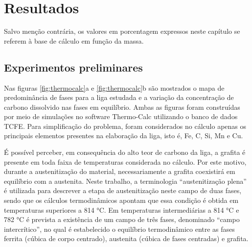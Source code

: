 \chapter{Resultados}

Salvo menção contrária, os valores em porcentagem expressos neste capítulo se referem à base de cálculo em função da massa.

\section{Experimentos preliminares}

\label{sec:expprelim}

Nas figuras \ref{fig:thermocalc}a e \ref{fig:thermocalc}b são mostrados o mapa de predominância de fases para a liga estudada e a variação da concentração de carbono dissolvido nas fases em equilíbrio. Ambas as figuras foram construídas por meio de simulações no software Thermo-Calc\textregistered{} utilizando o banco de dados TCFE. Para simplificação do problema, foram considerados no cálculo apenas os principais elementos presentes na elaboração da liga, isto é, Fe, C, Si, Mn e Cu.

É possível perceber, em consequência do alto teor de carbono da liga, a grafita é presente em toda faixa de temperaturas considerada no cálculo. Por este motivo, durante a austenitização do material, necessariamente a grafita coexistirá em equilíbrio com a austenita. Neste trabalho, a terminologia ``austenitização plena'' é utilizada para descrever a etapa de austenitização neste campo de duas fases, sendo que os cálculos termodinâmicos apontam que essa condição é obtida em temperaturas superiores a 814 °C. Em temperaturas intermediárias a 814 °C e 782 °C é prevista a existência de um campo de três fases, denominado ``campo intercrítico'', no qual é estabelecido o equilíbrio termodinâmico entre as fases ferrita (cúbica de corpo centrado), austenita (cúbica de fases centradas) e grafita.

